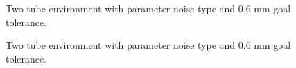 \begin{figure}
    \caption{Two tube environment with parameter noise type and 0.6 mm goal tolerance.}
    \label{fig:two-tube-traj}
\end{figure}
\begin{figure}
    \caption{Two tube environment with parameter noise type and 0.6 mm goal tolerance.}
    \label{fig:three-tube-traj}
\end{figure}
